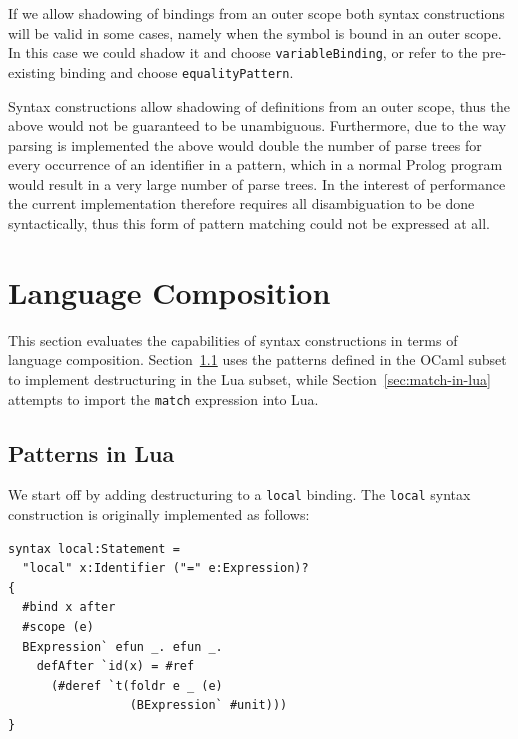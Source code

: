 \documentclass{kththesis}
\begin{document}
If we allow shadowing of bindings from an outer scope both syntax constructions will be valid in some cases, namely when the symbol is bound in an outer scope. In this case we could shadow it and choose \texttt{variableBinding}, or refer to the pre-existing binding and choose \texttt{equalityPattern}.

Syntax constructions allow shadowing of definitions from an outer scope, thus the above would not be guaranteed to be unambiguous. Furthermore, due to the way parsing is implemented the above would double the number of parse trees for every occurrence of an identifier in a pattern, which in a normal Prolog program would result in a very large number of parse trees. In the interest of performance the current implementation therefore requires all disambiguation to be done syntactically, thus this form of pattern matching could not be expressed at all.



\section{Language Composition} \label{sec:language-composition}

This section evaluates the capabilities of syntax constructions in terms of language composition. Section~\ref{sec:patterns-in-lua} uses the patterns defined in the OCaml subset to implement destructuring in the Lua subset, while Section~\ref{sec:match-in-lua} attempts to import the \texttt{match} expression into Lua.

\subsection{Patterns in Lua} \label{sec:patterns-in-lua}

We start off by adding destructuring to a \texttt{local} binding. The \texttt{local} syntax construction is originally implemented as follows:

\begin{verbatim}
syntax local:Statement =
  "local" x:Identifier ("=" e:Expression)?
{
  #bind x after
  #scope (e)
  BExpression` efun _. efun _.
    defAfter `id(x) = #ref
      (#deref `t(foldr e _ (e)
                 (BExpression` #unit)))
}
\end{verbatim}
\end{document}
